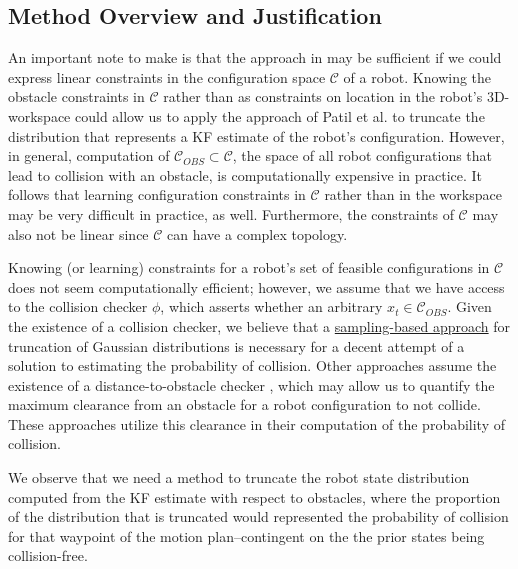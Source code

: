 \documentclass[journal]{IEEEtran}
\begin{document}
\subsection{Method Overview and Justification}

An important note to make is that the approach in \cite{IEEEhowto:patil} may be sufficient if we could express linear constraints in the configuration space $\mathcal{C}$ of a robot. Knowing the obstacle constraints in  $\mathcal{C}$ rather than as constraints on location in the robot's 3D-workspace could allow us to apply the approach of Patil et al. to truncate the distribution that represents a KF estimate of the robot's configuration. However, in general, computation of $\mathcal{C}_{OBS} \subset \mathcal{C}$, the space of all robot configurations that lead to collision with an obstacle, is computationally expensive in practice. It follows that learning configuration constraints in $\mathcal{C}$ rather than in the workspace may be very difficult in practice, as well. Furthermore, the constraints of $\mathcal{C}$ may also not be linear since $\mathcal{C}$ can have a complex topology.

Knowing (or learning) constraints for a robot's set of feasible configurations in $\mathcal{C}$ does not seem computationally efficient; however, we assume that we have access to the collision checker $\phi$, which asserts whether an arbitrary $x_t \in \mathcal{C}_{OBS}$. Given the existence of a collision checker, we believe that a \underline{sampling-based approach} for truncation of Gaussian distributions is necessary for a decent attempt of a solution to estimating the probability of collision. Other approaches assume the existence of a distance-to-obstacle checker {\color{red}{cite here}}, which may allow us to quantify the maximum clearance from an obstacle for a robot configuration to not collide. These approaches utilize this clearance in their computation of the probability of collision.

We observe that we need a method to truncate the robot state distribution computed from the KF estimate with respect to obstacles, where the proportion of the distribution that is truncated would represented the probability of collision for that waypoint of the motion plan--contingent on the the prior states being collision-free.
\end{document}
